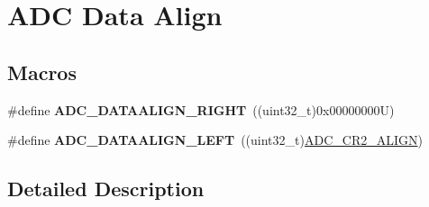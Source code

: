\hypertarget{group___a_d_c___data___align}{}\section{A\+DC Data Align}
\label{group___a_d_c___data___align}
\subsection*{Macros}
\begin{DoxyCompactItemize}
\item 
\mbox{\label{group___a_d_c___data___align_gafed5c0d327ad6d2cc0960f7943beb265}} 
\#define {\bfseries A\+D\+C\+\_\+\+D\+A\+T\+A\+A\+L\+I\+G\+N\+\_\+\+R\+I\+G\+HT}~((uint32\+\_\+t)0x00000000\+U)
\item 
\mbox{\label{group___a_d_c___data___align_ga8afeead661c1ffbc27a5405a254d60ba}} 
\#define {\bfseries A\+D\+C\+\_\+\+D\+A\+T\+A\+A\+L\+I\+G\+N\+\_\+\+L\+E\+FT}~((uint32\+\_\+t)\mbox{\hyperlink{group___peripheral___registers___bits___definition_gaf5950b5a7438a447584f6dd86c343362}{A\+D\+C\+\_\+\+C\+R2\+\_\+\+A\+L\+I\+GN}})
\end{DoxyCompactItemize}


\subsection{Detailed Description}
